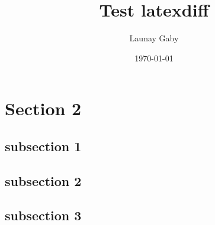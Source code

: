 \documentclass[11pt, a4paper]{article}
\author{Launay Gaby}
\title{Test latexdiff}
\date{\today}
\begin{document}
\maketitle



\section{Section 2}
\subsection{subsection 1}
\subsection{subsection 2}
\subsection{subsection 3}
\end{document}
